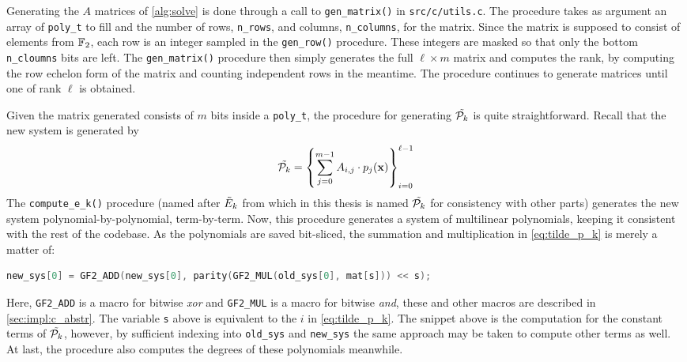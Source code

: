 Generating the $A$ matrices of \cref{alg:solve} is done through a call to \texttt{gen\_matrix()} in \texttt{src/c/utils.c}. The procedure takes as argument an array of \texttt{poly\_t} to fill and the number of rows, \texttt{n\_rows}, and columns, \texttt{n\_columns}, for the matrix. Since the matrix is supposed to consist of elements from $\mathbb{F}_2$, each row is an integer sampled in the \texttt{gen\_row()} procedure. These integers are masked so that only the bottom \texttt{n\_cloumns} bits are left. The \texttt{gen\_matrix()} procedure then simply generates the full $\ell \times m$ matrix and computes the rank, by computing the row echelon form of the matrix and counting independent rows in the meantime. The procedure continues to generate matrices until one of rank $\ell$ is obtained.

Given the matrix generated consists of $m$ bits inside a \texttt{poly\_t}, the procedure for generating $\Tilde{\mathcal{P}_k}$ is quite straightforward. Recall that the new system is generated by
\begin{equation} \label{eq:tilde_p_k}
    \Tilde{\mathcal{P}_k} = \left\{\sum_{j = 0}^{m - 1} A_{i,j} \cdot p_j(\mathbf{x})\right\}_{i=0}^{\ell - 1}
\end{equation}
The \texttt{compute\_e\_k()} procedure (named after $\Tilde{E}_k$ from \cite{cryptoeprint:2021/578} which in this thesis is named $\Tilde{\mathcal{P}_k}$ for consistency with other parts) generates the new system polynomial-by-polynomial, term-by-term. Now, this procedure generates a system of multilinear polynomials, keeping it consistent with the rest of the codebase. As the polynomials are saved bit-sliced, the summation and multiplication in \cref{eq:tilde_p_k} is merely a matter of:
\begin{lstlisting}[language=C,style=mystyle]
new_sys[0] = GF2_ADD(new_sys[0], parity(GF2_MUL(old_sys[0], mat[s])) << s);
\end{lstlisting}
Here, \texttt{GF2\_ADD} is a macro for bitwise \textit{xor} and \texttt{GF2\_MUL} is a macro for bitwise \textit{and}, these and other macros are described in \cref{sec:impl:c_abstr}. The variable \texttt{s} above is equivalent to the $i$ in \cref{eq:tilde_p_k}. The snippet above is the computation for the constant terms of $\Tilde{\mathcal{P}_k}$, however, by sufficient indexing into \texttt{old\_sys} and \texttt{new\_sys} the same approach may be taken to compute other terms as well. At last, the procedure also computes the degrees of these polynomials meanwhile.

